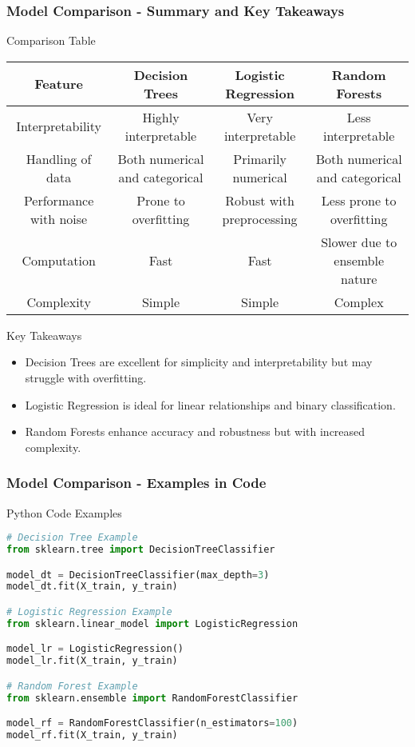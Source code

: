\documentclass[aspectratio=169]{beamer}
\begin{document}
\begin{frame}[fragile]
    \frametitle{Model Comparison - Summary and Key Takeaways}

    \begin{block}{Comparison Table}
        \begin{tabular}{|c|c|c|c|}
            \hline
            \textbf{Feature} & \textbf{Decision Trees} & \textbf{Logistic Regression} & \textbf{Random Forests} \\
            \hline
            Interpretability & Highly interpretable & Very interpretable & Less interpretable \\
            \hline
            Handling of data & Both numerical and categorical & Primarily numerical & Both numerical and categorical \\
            \hline
            Performance with noise & Prone to overfitting & Robust with preprocessing & Less prone to overfitting \\
            \hline
            Computation & Fast & Fast & Slower due to ensemble nature \\
            \hline
            Complexity & Simple & Simple & Complex \\
            \hline
        \end{tabular}
    \end{block}

    \begin{block}{Key Takeaways}
        \begin{itemize}
            \item Decision Trees are excellent for simplicity and interpretability but may struggle with overfitting.
            \item Logistic Regression is ideal for linear relationships and binary classification.
            \item Random Forests enhance accuracy and robustness but with increased complexity.
        \end{itemize}
    \end{block}
\end{frame}

\begin{frame}[fragile]
    \frametitle{Model Comparison - Examples in Code}

    \begin{block}{Python Code Examples}
        \begin{lstlisting}[language=Python]
# Decision Tree Example
from sklearn.tree import DecisionTreeClassifier

model_dt = DecisionTreeClassifier(max_depth=3)
model_dt.fit(X_train, y_train)

# Logistic Regression Example
from sklearn.linear_model import LogisticRegression

model_lr = LogisticRegression()
model_lr.fit(X_train, y_train)

# Random Forest Example
from sklearn.ensemble import RandomForestClassifier

model_rf = RandomForestClassifier(n_estimators=100)
model_rf.fit(X_train, y_train)
        \end{lstlisting}
    \end{block}
\end{frame}
\end{document}
